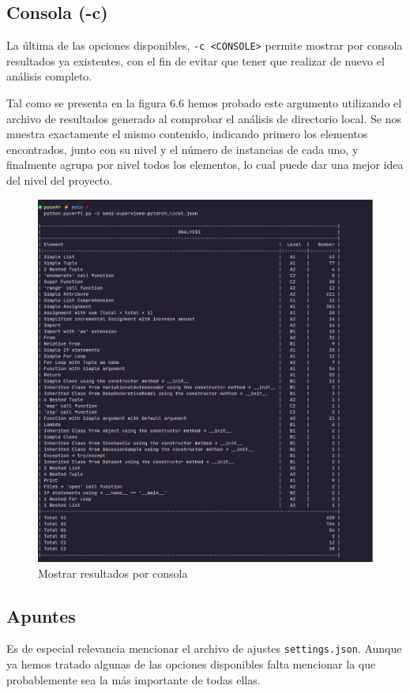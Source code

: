 \documentclass[a4paper, 12pt]{book}
\begin{document}
\subsection{Consola (-c)}

La última de las opciones disponibles, \texttt{-c <CONSOLE>} permite mostrar por consola resultados ya existentes, con el fin de evitar que tener que realizar de nuevo el análisis completo.

Tal como se presenta en la figura 6.6 hemos probado este argumento utilizando el archivo de resultados generado al comprobar el análisis de directorio local. Se nos muestra exactamente el mismo contenido, indicando primero los elementos encontrados, junto con su nivel y el número de instancias de cada uno, y finalmente agrupa por nivel todos los elementos, lo cual puede dar una mejor idea del nivel del proyecto.

\begin{figure}
    \centering
    \includegraphics[width=\textwidth, keepaspectratio]{img/results/backend_exe_c.png}
    \caption{Mostrar resultados por consola}
    \label{fig:analysis_console}
\end{figure}
\clearpage

\subsection{Apuntes}
Es de especial relevancia mencionar el archivo de ajustes \texttt{settings.json}. Aunque ya hemos tratado algunas de las opciones disponibles falta mencionar la que probablemente sea la más importante de todas ellas.
\end{document}
